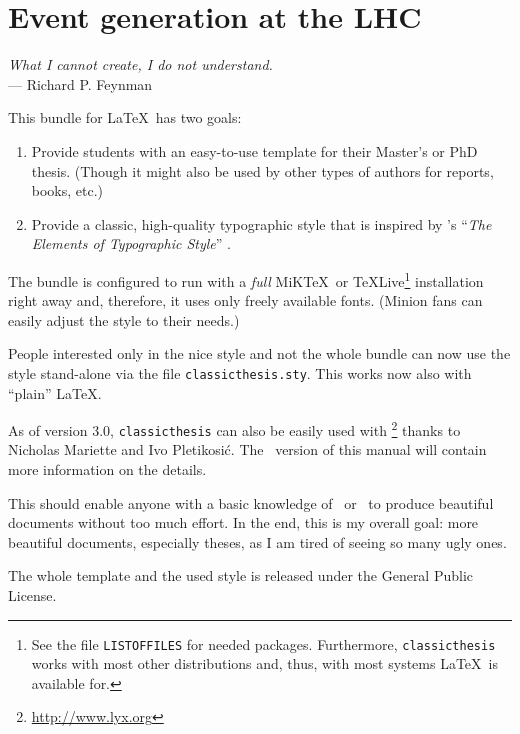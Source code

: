 \chapter{Event generation at the LHC}\label{ch:introduction}
\begin{flushright}{\slshape
        What I cannot create, I do not understand.} \\ \medskip
    --- Richard P. Feynman
\end{flushright}


This bundle for \LaTeX\ has two goals:
\begin{enumerate}
    \item Provide students with an easy-to-use template for their
    Master's
    or PhD thesis. (Though it might also be used by other types of
    authors
    for reports, books, etc.)
    \item Provide a classic, high-quality typographic style that is
    inspired by \citeauthor{bringhurst:2002}'s ``\emph{The Elements of
    Typographic Style}'' \citep{bringhurst:2002}.
    \marginpar{\myTitle \myVersion}
\end{enumerate}
The bundle is configured to run with a \emph{full}
MiK\TeX\ or \TeX Live\footnote{See the file \texttt{LISTOFFILES} for
needed packages. Furthermore, \texttt{classicthesis}
works with most other distributions and, thus, with most systems
\LaTeX\ is available for.}
installation right away and, therefore, it uses only freely available
fonts. (Minion fans can easily adjust the style to their needs.)

People interested only in the nice style and not the whole bundle can
now use the style stand-alone via the file \texttt{classicthesis.sty}.
This works now also with ``plain'' \LaTeX.

As of version 3.0, \texttt{classicthesis} can also be easily used with
\mLyX\footnote{\url{http://www.lyx.org}} thanks to Nicholas Mariette
and Ivo Pletikosić. The \mLyX\ version of this manual will contain
more information on the details.

This should enable anyone with a basic knowledge of \LaTeXe\ or \mLyX\ to
produce beautiful documents without too much effort. In the end, this
is my overall goal: more beautiful documents, especially theses, as I
am tired of seeing so many ugly ones.

The whole template and the used style is released under the
 General Public License.

